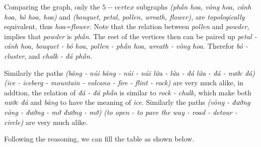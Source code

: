 \documentclass{article}
\begin{document}
\begin{soln}
\begin{otherlanguage}{vietnamese}

    Comparing the graph, only the $5-vertex$ subgraphs \textit{(phấn hoa, vòng hoa, cánh hoa, bó hoa, hoa)} and
    \textit{(bouquet, petal, pollen, wreath, flower),} are \textit{topologically} equivalent, thus \textit{hoa=flower}.
    Note that the relation between \textit{pollen} and \textit{powder},
    implies that \textit{powder} is \textit{phấn}. The rest of the vertices then can be paired up
    \textit{petal - cánh hoa, bouquet - bó hoa, pollen - phấn hoa, wreath - vòng hoa.}
    Therefor \textit{bó - cluster}, and \textit{chalk - đá phấn.}

    Similarly the paths \textit{(băng - núi băng - núi - núi lửa - lửa - đá lửa - đá - nước đá)} 
    \textit{(ice - iceberg - mountain - volcano - fire - flint - rock)} are very much alike,
    in addtion, the relation of \textit{đá - đá phấn} is similar to \textit{rock - chalk,}
    which make both \textit{nước đá} and \textit{băng} to have the meaning of \textit{ice}.
    Similarly the paths \textit{(vòng - đường vòng - đường - mở đường - mở)} 
    \textit{(to open - to pave the way - road - detour - circle)} are very much alike.

\newpage

    Following the reasoning, we can fill the table as shown below.


\end{otherlanguage}
\end{soln}
\end{document}
